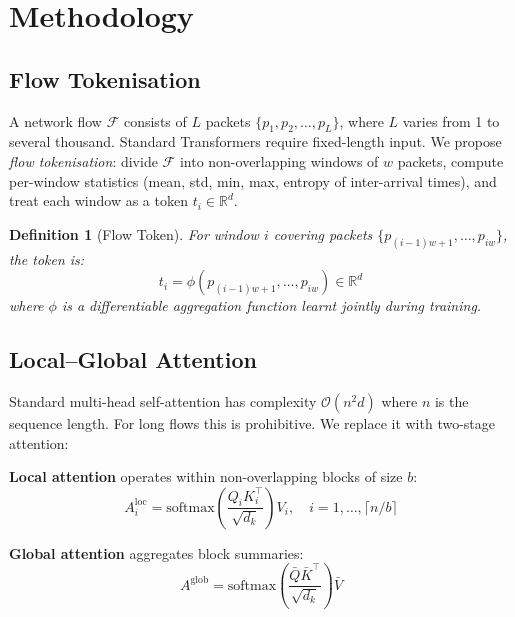 \documentclass[conference]{IEEEtran}
\newtheorem{definition}{Definition}
\begin{document}
\section{Methodology}
\label{sec:method}

\subsection{Flow Tokenisation}
\label{sec:tokenisation}

A network flow $\mathcal{F}$ consists of $L$ packets
$\{p_1, p_2, \ldots, p_L\}$, where $L$ varies from 1 to several
thousand. Standard Transformers require fixed-length input. We propose
\emph{flow tokenisation}: divide $\mathcal{F}$ into non-overlapping
windows of $w$ packets, compute per-window statistics (mean, std,
min, max, entropy of inter-arrival times), and treat each window as
a token $t_i \in \mathbb{R}^d$.

\begin{definition}[Flow Token]
	For window $i$ covering packets $\{p_{(i-1)w+1}, \ldots, p_{iw}\}$,
	the token is:
	\[
		t_i = \phi(p_{(i-1)w+1}, \ldots, p_{iw}) \in \mathbb{R}^d
	\]
	where $\phi$ is a differentiable aggregation function learnt jointly
	during training.
\end{definition}

\subsection{Local--Global Attention}
\label{sec:attention}

Standard multi-head self-attention has complexity
$\mathcal{O}(n^2 d)$ where $n$ is the sequence length. For long
flows this is prohibitive. We replace it with two-stage attention:

\textbf{Local attention} operates within non-overlapping blocks of
size $b$:
\begin{equation}
	A^{\text{loc}}_i = \text{softmax}\!\left(
	\frac{Q_i K_i^\top}{\sqrt{d_k}}
	\right)V_i, \quad i = 1,\ldots,\lceil n/b \rceil
	\label{eq:local_att}
\end{equation}

\textbf{Global attention} aggregates block summaries:
\begin{equation}
	A^{\text{glob}} = \text{softmax}\!\left(
	\frac{\bar{Q}\bar{K}^\top}{\sqrt{d_k}}
	\right)\bar{V}
	\label{eq:global_att}
\end{equation}
\end{document}
